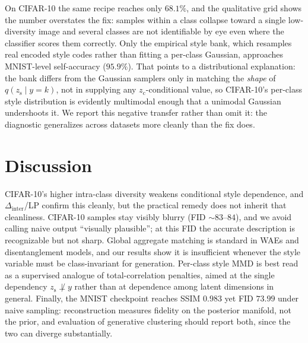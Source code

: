 \documentclass[letterpaper]{article} %
\newcommand{\zc}{z_{\mathrm{c}}}
\newcommand{\zs}{z_{\mathrm{s}}}
\newcommand{\Dinter}{\Delta_{\mathrm{inter}}}
\begin{document}
On CIFAR-10 the same recipe reaches only $68.1\%$, and the qualitative grid
shows the number overstates the fix: samples within a class collapse toward a
single low-diversity image and several classes are not identifiable by eye
even where the classifier scores them correctly. Only the empirical style
bank, which resamples real encoded style codes rather than fitting a
per-class Gaussian, approaches MNIST-level self-accuracy ($95.9\%$). That
points to a distributional explanation: the bank differs from the Gaussian
samplers only in matching the \emph{shape} of $q(\zs\mid y{=}k)$, not in
supplying any $\zc$-conditional value, so CIFAR-10's per-class style
distribution is evidently multimodal enough that a unimodal Gaussian
undershoots it. We report this negative transfer rather than omit it: the
diagnostic generalizes across datasets more cleanly than the fix does.

\section{Discussion}

CIFAR-10's higher intra-class diversity weakens conditional style dependence,
and $\Dinter$/LP confirm this cleanly, but the practical remedy does not
inherit that cleanliness. CIFAR-10 samples stay visibly blurry (FID
$\sim83$--$84$), and we avoid calling naive output ``visually plausible''; at
this FID the accurate description is recognizable but not sharp. Global
aggregate matching is standard in WAEs and disentanglement models, and our
results show it is insufficient whenever the style variable must be
class-invariant for generation. Per-class style MMD is best read as a
supervised analogue of total-correlation penalties, aimed at the single
dependency $\zs\not\perp y$ rather than at dependence among latent dimensions
in general. Finally, the MNIST checkpoint reaches SSIM $0.983$ yet FID
$73.99$ under naive sampling: reconstruction measures fidelity on the
posterior manifold, not the prior, and evaluation of generative clustering
should report both, since the two can diverge substantially.
\end{document}
